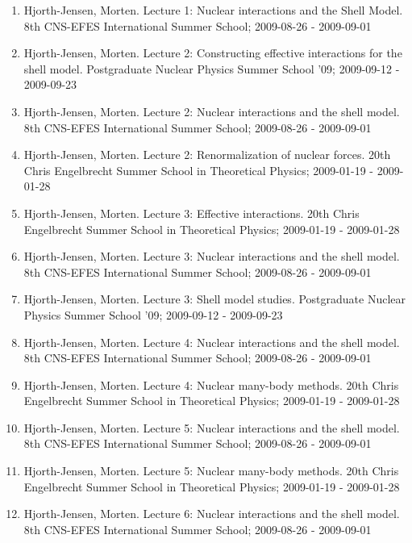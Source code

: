 \documentclass[%
oneside,                 %
final,                   %
10pt]{article}
\begin{document}
\begin{enumerate}
\item Hjorth-Jensen, Morten.  Lecture 1: Nuclear interactions and the Shell Model. 8th CNS-EFES International Summer School; 2009-08-26 - 2009-09-01

\item Hjorth-Jensen, Morten.  Lecture 2: Constructing effective interactions for the shell model. Postgraduate Nuclear Physics Summer School '09; 2009-09-12 - 2009-09-23

\item Hjorth-Jensen, Morten.  Lecture 2: Nuclear interactions and the shell model. 8th CNS-EFES International Summer School; 2009-08-26 - 2009-09-01

\item Hjorth-Jensen, Morten.  Lecture 2: Renormalization of nuclear forces. 20th Chris Engelbrecht Summer School in Theoretical Physics; 2009-01-19 - 2009-01-28

\item Hjorth-Jensen, Morten.  Lecture 3: Effective interactions. 20th Chris Engelbrecht Summer School in Theoretical Physics; 2009-01-19 - 2009-01-28

\item Hjorth-Jensen, Morten.  Lecture 3: Nuclear interactions and the shell model. 8th CNS-EFES International Summer School; 2009-08-26 - 2009-09-01

\item Hjorth-Jensen, Morten.  Lecture 3: Shell model studies. Postgraduate Nuclear Physics Summer School '09; 2009-09-12 - 2009-09-23

\item Hjorth-Jensen, Morten.  Lecture 4: Nuclear interactions and the shell model. 8th CNS-EFES International Summer School; 2009-08-26 - 2009-09-01

\item Hjorth-Jensen, Morten.  Lecture 4: Nuclear many-body methods. 20th Chris Engelbrecht Summer School in Theoretical Physics; 2009-01-19 - 2009-01-28

\item Hjorth-Jensen, Morten.  Lecture 5: Nuclear interactions and the shell model. 8th CNS-EFES International Summer School; 2009-08-26 - 2009-09-01

\item Hjorth-Jensen, Morten.  Lecture 5: Nuclear many-body methods. 20th Chris Engelbrecht Summer School in Theoretical Physics; 2009-01-19 - 2009-01-28

\item Hjorth-Jensen, Morten.  Lecture 6: Nuclear interactions and the shell model. 8th CNS-EFES International Summer School; 2009-08-26 - 2009-09-01


\end{enumerate}
\end{document}
